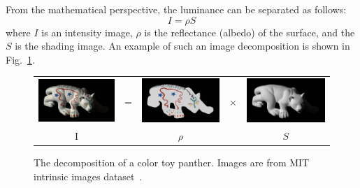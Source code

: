 From the mathematical perspective, the luminance can be separated as follows:
\begin{equation}\label{eq:sfs_equation}
    I = \rho S
\end{equation}
where $I$ is an intensity image, $\rho$ is the reflectance (albedo) of the surface, and the $S$ is the shading image. 
An example of such an image decomposition is shown in Fig.~\ref{fig:shading}.
\begin{figure}[!htbp]
\centering
\setlength{\tabcolsep}{0.1em} %
 {\renewcommand{\arraystretch}{0.6}%
\begin{tabular}{c c c c c}
   \includegraphics[height = 0.16\linewidth]{figures/panther_rgb.pdf} \hspace{0.05cm}   &
   \multirow{-10}{*}{\parbox[t]{3.5mm}{=}}  & 
   \includegraphics[height = 0.16\linewidth]{figures/panther_rho.pdf} &
    \multirow{-10}{*}{\parbox[t]{3.5mm}{$\times$}}  & 
   \includegraphics[height = 0.16\linewidth]{figures/panther_shade.pdf} \\
      {I} &{} &{$\rho$} & {}& {$S$}            
 \end{tabular}}
\caption{The decomposition of a color toy panther. Images are from MIT intrinsic images dataset~\cite{grosse2009ground}.}
\label{fig:shading}
\end{figure}

